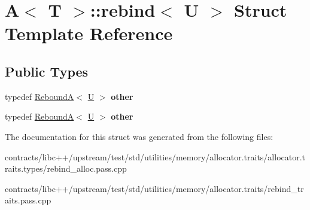 \hypertarget{struct_a_1_1rebind}{}\section{A$<$ T $>$\+:\+:rebind$<$ U $>$ Struct Template Reference}
\label{struct_a_1_1rebind}
\subsection*{Public Types}
\begin{DoxyCompactItemize}
\item 
\mbox{\label{struct_a_1_1rebind_a3e42bb48bb7d93abfa8c1c24ae2cf041}} 
typedef \mbox{\hyperlink{struct_rebound_a}{ReboundA}}$<$ \mbox{\hyperlink{union_u}{U}} $>$ {\bfseries other}
\item 
\mbox{\label{struct_a_1_1rebind_a3e42bb48bb7d93abfa8c1c24ae2cf041}} 
typedef \mbox{\hyperlink{struct_rebound_a}{ReboundA}}$<$ \mbox{\hyperlink{union_u}{U}} $>$ {\bfseries other}
\end{DoxyCompactItemize}


The documentation for this struct was generated from the following files\+:\begin{DoxyCompactItemize}
\item 
contracts/libc++/upstream/test/std/utilities/memory/allocator.\+traits/allocator.\+traits.\+types/rebind\+\_\+alloc.\+pass.\+cpp\item 
contracts/libc++/upstream/test/std/utilities/memory/allocator.\+traits/rebind\+\_\+traits.\+pass.\+cpp\end{DoxyCompactItemize}
